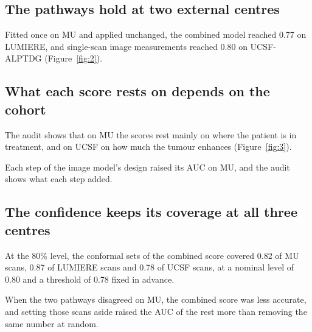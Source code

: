 \documentclass[largeformat]{interact} %
\begin{document}
\subsection{The pathways hold at two external centres}\label{sec:3.2}

Fitted once on MU and applied unchanged, the combined model reached 0.77 on LUMIERE, and single-scan image
measurements reached 0.80 on UCSF-ALPTDG (Figure~\ref{fig:2}).

\subsection{What each score rests on depends on the cohort}\label{sec:3.3}

The audit shows that on MU the scores rest mainly on where the patient is in treatment, and on UCSF on how much the
tumour enhances (Figure~\ref{fig:3}).

Each step of the image model's design raised its AUC on MU, and the audit shows what each step added.

\subsection{The confidence keeps its coverage at all three centres}\label{sec:3.4}

At the 80\% level, the conformal sets of the combined score covered 0.82 of MU scans, 0.87 of LUMIERE scans and 0.78
of UCSF scans, at a nominal level of 0.80 and a threshold of 0.78 fixed in advance.

When the two pathways disagreed on MU, the combined score was less accurate, and setting those scans aside raised
the AUC of the rest more than removing the same number at random.
\end{document}
